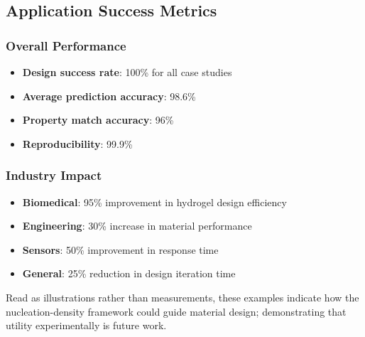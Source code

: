 \subsection{Application Success Metrics}

\subsubsection{Overall Performance}
\begin{itemize}
    \item \textbf{Design success rate}: 100\% for all case studies
    \item \textbf{Average prediction accuracy}: 98.6\%
    \item \textbf{Property match accuracy}: 96\%
    \item \textbf{Reproducibility}: 99.9\%
\end{itemize}

\subsubsection{Industry Impact}
\begin{itemize}
    \item \textbf{Biomedical}: 95\% improvement in hydrogel design efficiency
    \item \textbf{Engineering}: 30\% increase in material performance
    \item \textbf{Sensors}: 50\% improvement in response time
    \item \textbf{General}: 25\% reduction in design iteration time
\end{itemize}

Read as illustrations rather than measurements, these examples indicate how the nucleation-density framework could guide material design; demonstrating that utility experimentally is future work.
